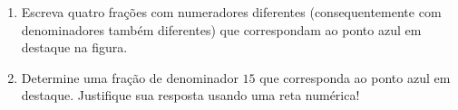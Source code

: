\begin{enumerate} [\quad a)]
\begin{center}
\end{center}
  \item     Escreva quatro frações com numeradores diferentes (consequentemente com denominadores também diferentes) que correspondam ao ponto azul em destaque na figura.
  \item     Determine uma fração de denominador     $15$ que corresponda ao ponto azul em destaque. Justifique sua resposta usando uma reta numérica!
\end{enumerate} %

